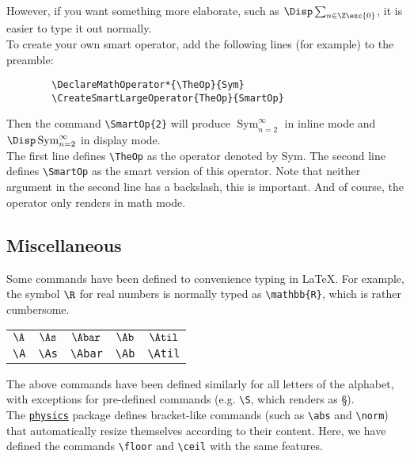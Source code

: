 However, if you want something more elaborate, such as $\Disp\sum_{n\in\Z\exc\{0\}}$, it is easier to type it out normally.\\

To create your own smart operator, add the following lines (for example) to the preamble:

\begin{verbatim}
        \DeclareMathOperator*{\TheOp}{Sym}
        \CreateSmartLargeOperator{TheOp}{SmartOp}
\end{verbatim}

Then the command \verb!\SmartOp{2}! will produce $\operatorname*{Sym}_{n=2}^\infty$ in inline mode and $\Disp\operatorname*{Sym}_{n=2}^\infty$ in display mode.\\

The first line defines \verb!\TheOp! as the operator denoted by Sym. The second line defines \verb!\SmartOp! as the smart version of this operator. Note that neither argument in the second line has a backslash, this is important. And of course, the operator only renders in math mode.

\subsection{Miscellaneous}

Some commands have been defined to convenience typing in \LaTeX. For example, the symbol $\R$ for real numbers is normally typed as \verb!\mathbb{R}!, which is rather cumbersome.

\begin{center}
    \begin{tabular}{*{5}{c}} %
        $\A$ & $\As$ & $\Abar$ & $\Ab$ & $\Atil$ \\
        \verb!\A! & \verb!\As! & \verb!\Abar! & \verb!\Ab! & \verb!\Atil!
    \end{tabular}
\end{center}

The above commands have been defined similarly for all letters of the alphabet, with exceptions for pre-defined commands (e.g. \verb!\S!, which renders as \S).\\

The \href{https://ctan.org/pkg/physics}{\texttt{physics}} package defines bracket-like commands (such as \verb!\abs! and \verb!\norm!) that automatically resize themselves according to their content. Here, we have defined the commands \verb!\floor! and \verb!\ceil! with the same features.

